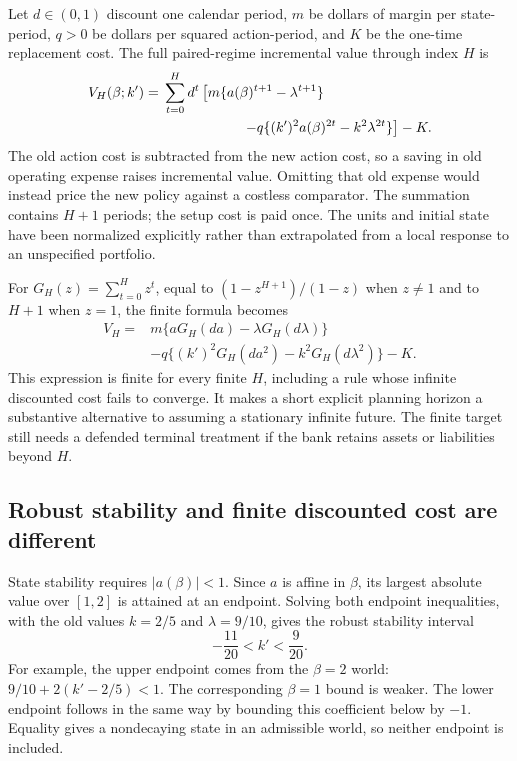 Let $d\in(0,1)$ discount one calendar period, $m$ be dollars of margin per
state-period, $q>0$ be dollars per squared action-period, and $K$ be the
one-time replacement cost. The full paired-regime incremental value through
index $H$ is
\begin{equation}
 \begin{split}
 V_H(\beta;k')={}&\sum_{t=0}^H d^t
 \left[m\{a(\beta)^{t+1}-\lambda^{t+1}\}\right.\\
 &\left.\hspace{20mm}-q\{(k')^2a(\beta)^{2t}-k^2\lambda^{2t}\}\right]-K.
 \end{split}
 \label{exec17:s6-full-finite}
\end{equation}
The old action cost is subtracted from the new action cost, so a saving in
old operating expense raises incremental value. Omitting that old expense
would instead price the new policy against a costless comparator. The
summation contains $H+1$ periods; the setup cost is paid once. The units and
initial state have been normalized explicitly rather than extrapolated
from a local response to an unspecified portfolio.

For $G_H(z)=\sum_{t=0}^Hz^t$, equal to $(1-z^{H+1})/(1-z)$ when
$z\ne1$ and to $H+1$ when $z=1$, the finite formula becomes
\begin{equation}
 \begin{split}
 V_H={}&m\{aG_H(da)-\lambda G_H(d\lambda)\}\\
       &-q\{(k')^2G_H(da^2)-k^2G_H(d\lambda^2)\}-K.
 \end{split}
 \label{exec17:s6-full-geometric}
\end{equation}
This expression is finite for every finite $H$, including a rule whose
infinite discounted cost fails to converge. It makes a short explicit
planning horizon a substantive alternative to assuming a stationary
infinite future. The finite target still needs a defended terminal
treatment if the bank retains assets or liabilities beyond $H$.

\subsection{Robust stability and finite discounted cost are different}
\label{exec17:s6-rule-boundaries}

State stability requires $|a(\beta)|<1$. Since $a$ is affine in $\beta$,
its largest absolute value over $[1,2]$ is attained at an endpoint. Solving
both endpoint inequalities, with the old values $k=2/5$ and
$\lambda=9/10$, gives the robust stability interval
\begin{equation}
 -\frac{11}{20}<k'<\frac9{20}.
 \label{exec17:s6-robust-stability}
\end{equation}
For example, the upper endpoint comes from the $\beta=2$ world:
$9/10+2(k'-2/5)<1$. The corresponding $\beta=1$ bound is weaker.
The lower endpoint follows in the same way by bounding this coefficient
below by $-1$. Equality gives a nondecaying state in an admissible world,
so neither endpoint is included.

